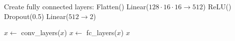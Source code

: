 \documentclass[a4paper,12pt]{article}
\begin{document}
\begin{algorithm}
\begin{algorithmic}[1]
                                \State Create fully connected layers:
                                \Indent
                                    \State Flatten()
                                    \State Linear($128 \cdot 16 \cdot 16 \to 512$)
                                    \State ReLU()
                                    \State Dropout(0.5)
                                    \State Linear($512 \to 2$) 
                                \EndIndent
                            \EndFunction
                            
                                \State $x \gets$ conv\_layers($x$)
                                \State $x \gets$ fc\_layers($x$)
                                \State \Return $x$
                            \EndFunction
                            \end{algorithmic}
                            \end{algorithm}
\end{document}
